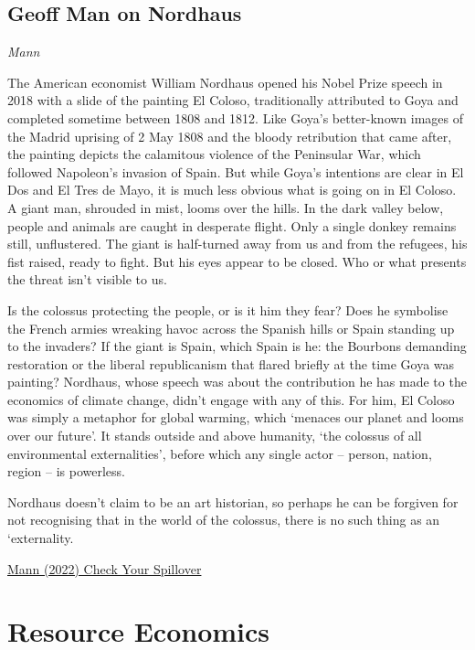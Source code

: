 \documentclass[
]{book}
\begin{document}
\hypertarget{geoff-man-on-nordhaus}{%
\section{Geoff Man on Nordhaus}\label{geoff-man-on-nordhaus}}

\emph{Mann}

The \hspace{0pt} American economist William Nordhaus opened his Nobel Prize speech in 2018 with a slide of the painting El Coloso, traditionally attributed to Goya and completed sometime between 1808 and 1812. Like Goya's better-known images of the Madrid uprising of 2 May 1808 and the bloody retribution that came after, the painting depicts the calamitous violence of the Peninsular War, which followed Napoleon's invasion of Spain. But while Goya's intentions are clear in El Dos and El Tres de Mayo, it is much less obvious what is going on in El Coloso. A giant man, shrouded in mist, looms over the hills. In the dark valley below, people and animals are caught in desperate flight. Only a single donkey remains still, unflustered. The giant is half-turned away from us and from the refugees, his fist raised, ready to fight. But his eyes appear to be closed. Who or what presents the threat isn't visible to us.

Is the colossus protecting the people, or is it him they fear? Does he symbolise the French armies wreaking havoc across the Spanish hills or Spain standing up to the invaders? If the giant is Spain, which Spain is he: the Bourbons demanding restoration or the liberal republicanism that flared briefly at the time Goya was painting? Nordhaus, whose speech was about the contribution he has made to the economics of climate change, didn't engage with any of this. For him, El Coloso was simply a metaphor for global warming, which `menaces our planet and looms over our future'. It stands outside and above humanity, `the colossus of all environmental externalities', before which any single actor -- person, nation, region -- is powerless.

Nordhaus doesn't claim to be an art historian, so perhaps he can be forgiven for not recognising that in the world of the colossus, there is no such thing as an `externality.

\href{https://www.lrb.co.uk/the-paper/v44/n03/geoff-mann/check-your-spillover}{Mann (2022) Check Your Spillover}

\hypertarget{resource-economics}{%
\chapter{Resource Economics}\label{resource-economics}}
\end{document}
